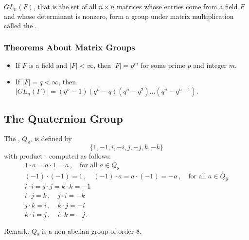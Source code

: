 \begin{definition}
	$GL_n(F)$, that is the set of all $n \times n$ matrices whose 
	entries come from a field $F$ and whose determinant is nonzero, 
	form a group under matrix multiplication called the .
\end{definition}

\subsubsection{Theorems About Matrix Groups}

\begin{itemize}
	\item If $F$ is a field and $|F| < \infty$, then $|F| = p^m$ 
	for some prime $p$ and integer $m$.
	
	\item If $|F| = q < \infty$, then $|GL_n(F)| = (q^n - 1)(q^n - 
	q)(q^n - q^2) \dots (q^n - q^{n-1})$.
\end{itemize}


\newpage

\subsection{The Quaternion Group}

\begin{definition}
	The , $Q_8$, is defined by 
	\[
		\{ 1, -1, i, -i, j, -j, k, -k \}
	\]
	with product $\cdot$ computed as follows:
	\begin{gather}
		1 \cdot a = a \cdot 1 = a\,, \quad
			\text{for all } a \in Q_8 \\
		(-1) \cdot (-1) = 1\,, \quad (-1) \cdot a = a \cdot (-1)
			= -a\,, \quad \text{for all } a \in Q_8 \\
		i \cdot i = j \cdot j = k \cdot k = -1 \\
		i \cdot j = k\,, \quad j \cdot i = -k \\
		j \cdot k = i\,, \quad k \cdot j = -i \\
		k \cdot i = j\,, \quad i \cdot k = -j\,.
	\end{gather}
\end{definition}

Remark: $Q_8$ is a non-abelian group of order 8.

